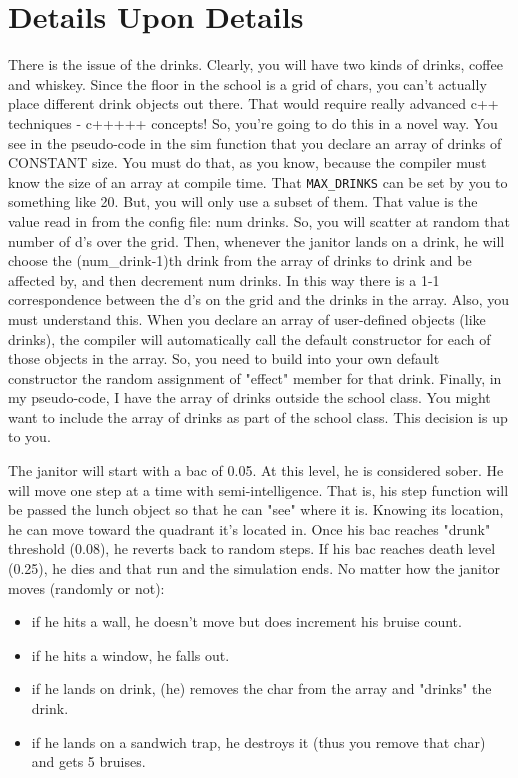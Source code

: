 \documentclass[
    subject = {{Comp Sci}},
    course = {{1570}},
    section = {{101}},
    assignment = {{Assignment 10 \\ Final Project}},
    name = {{Student One ; Student Two}},
    email = {{stosid@mst.edu ; sttsid@mst.edu}}
]{eey-homework}
\begin{document}
\section{Details Upon Details}
There is the issue of the drinks.
Clearly, you will have two kinds of drinks, coffee and whiskey.
Since the floor in the school is a grid of chars, you can't actually place different drink objects out there.
That would require really advanced c++ techniques - c+++++ concepts! So, you're going to do this in a novel way.
You see in the pseudo-code in the sim function that you declare an array of drinks of CONSTANT size.
You must do that, as you know, because the compiler must know the size of an array at compile time.
That \verb|MAX_DRINKS| can be set by you to something like 20.
But, you will only use a subset of them.
That value is the value read in from the config file: num drinks.
So, you will scatter at random that number of d's over the grid.
Then, whenever the janitor lands on a drink, he will choose the (num\_drink-1)th drink from the array of drinks to drink and be affected by, and then decrement num drinks.
In this way there is a 1-1 correspondence between the d's on the grid and the drinks in the array.
Also, you must understand this.
When you declare an array of user-defined objects (like drinks), the compiler will automatically call the default constructor for each of those objects in the array.
So, you need to build into your own default constructor the random assignment of "effect" member for that drink.
Finally, in my pseudo-code, I have the array of drinks outside the school class.
You might want to include the array of drinks as part of the school class.
This decision is up to you.\hfill\break

The janitor will start with a bac of 0.05.
At this level, he is considered sober.
He will move one step at a time with semi-intelligence.
That is, his step function will be passed the lunch object so that he can "see" where it is.
Knowing its location, he can move toward the quadrant it's located in.
Once his bac reaches "drunk" threshold (0.08), he reverts back to random steps.
If his bac reaches death level (0.25), he dies and that run and the simulation ends.
No matter how the janitor moves (randomly or not):

\begin{itemize}
    \item if he hits a wall, he doesn't move but does increment his bruise count.
    \item if he hits a window, he falls out.
    \item if he lands on drink, (he) removes the char from the array and "drinks" the drink.
    \item if he lands on a sandwich trap, he destroys it (thus you remove that char) and gets 5 bruises.
\end{itemize}
\end{document}
